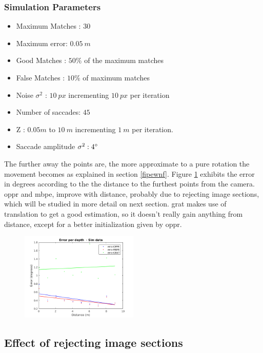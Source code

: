 \subsubsection{Simulation Parameters}
\begin{itemize}
	\item Maximum Matches : $30$
	\item Maximum error: $0.05 \ m$
	\item Good Matches : $50 \%$ of the maximum matches
	\item False Matches : $10 \%$ of maximum matches
	\item Noise $\sigma^2$ : $10 \ px$ incrementing $10 \ px$ per iteration
	\item Number of saccades: $45$
	\item Z : $0.05 m$ to $10 \ m$ incrementing $1 \ m$ per iteration.
	\item Saccade amplitude $\sigma^2 : 4 \degree $
\end{itemize}
The further away the points are, the more approximate to a pure rotation the movement becomes as explained in section \ref{fipewnf}.
Figure \ref{cha5:sec1:depthh} exhibits the error in degrees according to the the distance to the furthest points from the camera. \acrshort{oppr} and \acrshort{mbpe}, improve with distance, probably due to rejecting image sections, which will be studied in more detail on next section. \acrshort{grat} makes use of translation to get a good estimation, so it doesn't really gain anything from distance, except for a better initialization given by \acrshort{oppr}.
\begin{figure}[ht]
	\centering
	\includegraphics[width=0.5\textwidth]{images/sim/depthh.png}
	\label{cha5:sec1:depthh}
\end{figure}	

\subsection{Effect of rejecting image sections}

